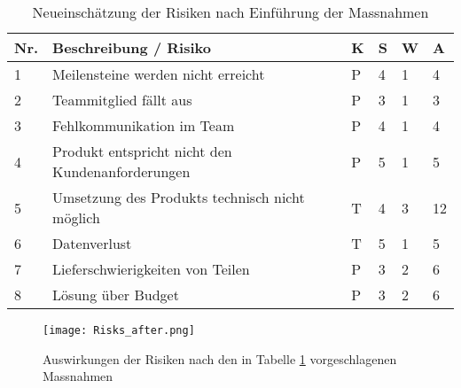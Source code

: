 \begin{table}[htb]
	\begin{tabularx}{\textwidth}{|l|X|l|l|l||l|}
		\hline
		\textbf{Nr.} & \textbf{Beschreibung / Risiko} & \textbf{K} & \textbf{S} & \textbf{W} & \textbf{A} \\
		\hline
		1 & Meilensteine werden nicht erreicht & P & 4 & 1 & 4 \\
		\hline
		2 & Teammitglied fällt aus & P & 3 & 1 & 3 \\
		\hline
		3 & Fehlkommunikation im Team & P & 4 & 1 & 4 \\
		\hline
		4 & Produkt entspricht nicht den Kundenanforderungen & P & 5 & 1 & 5 \\
		\hline
		5 & Umsetzung des Produkts technisch nicht möglich & T & 4 & 3 & 12 \\
		\hline
		6 & Datenverlust & T & 5 & 1 & 5 \\
		\hline
		7 & Lieferschwierigkeiten von Teilen & P & 3 & 2 & 6 \\
		\hline
		8 & Lösung über Budget & P & 3 & 2 & 6 \\
		\hline
	\end{tabularx}
	\caption{Neueinschätzung der Risiken nach Einführung der Massnahmen}
	\label{tbl:Massnahmen}
\end{table}

\vspace{1em}

\begin{figure}[h!]
	\centering
	\texttt{[image: Risks\_after.png]}
	\caption{Auswirkungen der Risiken nach den in Tabelle \ref{tbl:Massnahmen} vorgeschlagenen Massnahmen}
\end{figure}
